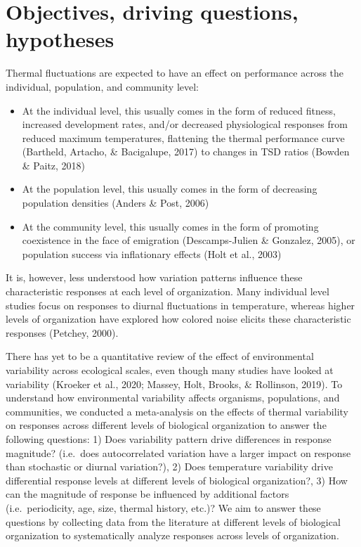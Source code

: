 \documentclass[12pt,twoside]{reedthesis}
\begin{document}
\hypertarget{objectives-driving-questions-hypotheses}{%
\section{Objectives, driving questions, hypotheses}\label{objectives-driving-questions-hypotheses}}

Thermal fluctuations are expected to have an effect on performance across the individual, population, and community level:
\begin{itemize}
\item
  At the individual level, this usually comes in the form of reduced fitness, increased development rates, and/or decreased physiological responses from reduced maximum temperatures, flattening the thermal performance curve (Bartheld, Artacho, \& Bacigalupe, 2017) to changes in TSD ratios (Bowden \& Paitz, 2018)
\item
  At the population level, this usually comes in the form of decreasing population densities (Anders \& Post, 2006)
\item
  At the community level, this usually comes in the form of promoting coexistence in the face of emigration (Descamps-Julien \& Gonzalez, 2005), or population success via inflationary effects (Holt et al., 2003)
\end{itemize}
It is, however, less understood how variation patterns influence these characteristic responses at each level of organization. Many individual level studies focus on responses to diurnal fluctuations in temperature, whereas higher levels of organization have explored how colored noise elicits these characteristic responses (Petchey, 2000).

There has yet to be a quantitative review of the effect of environmental variability across ecological scales, even though many studies have looked at variability (Kroeker et al., 2020; Massey, Holt, Brooks, \& Rollinson, 2019). To understand how environmental variability affects organisms, populations, and communities, we conducted a meta-analysis on the effects of thermal variability on responses across different levels of biological organization to answer the following questions: 1) Does variability pattern drive differences in response magnitude? (i.e.~does autocorrelated variation have a larger impact on response than stochastic or diurnal variation?), 2) Does temperature variability drive differential response levels at different levels of biological organization?, 3) How can the magnitude of response be influenced by additional factors (i.e.~periodicity, age, size, thermal history, etc.)? We aim to answer these questions by collecting data from the literature at different levels of biological organization to systematically analyze responses across levels of organization.
\end{document}
